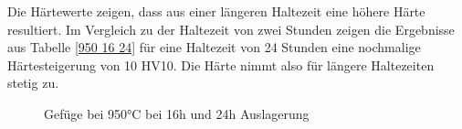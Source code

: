 \documentclass[a4paper, 11pt]{tubsreprt}
\begin{document}
Die Härtewerte zeigen, dass aus einer längeren Haltezeit eine höhere Härte resultiert. Im Vergleich zu der Haltezeit von zwei Stunden zeigen die Ergebnisse aus Tabelle \ref{950 16 24} für eine Haltezeit von 24 Stunden eine nochmalige Härtesteigerung von 10 HV10. Die Härte nimmt also für längere Haltezeiten stetig zu. 



\begin{figure}
	\caption{Gefüge bei 950°C bei 16h und 24h Auslagerung}
	\label{950 lange auslagerung}
\end{figure}
\end{document}
